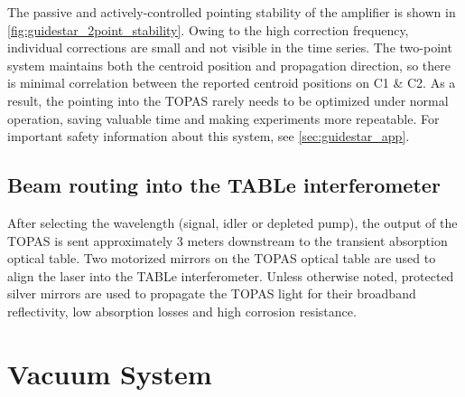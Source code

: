 The passive and actively-controlled pointing stability of the amplifier is shown in \cref{fig:guidestar_2point_stability}. Owing to the high correction frequency, individual corrections are small and not visible in the time series. The two-point system maintains both the centroid position and propagation direction, so there is minimal correlation between the reported centroid positions on C1 \& C2. As a result, the pointing into the TOPAS rarely needs to be optimized under normal operation, saving valuable time and making experiments more repeatable. For important safety information about this system, see \cref{sec:guidestar_app}.


\subsection{Beam routing into the TABLe interferometer}

After selecting the wavelength (signal, idler or depleted pump), the output of the TOPAS is sent approximately 3 meters downstream to the transient absorption optical table. Two motorized mirrors on the TOPAS optical table are used to align the laser into the TABLe interferometer. Unless otherwise noted, protected silver mirrors are used to propagate the TOPAS light for their broadband reflectivity, low absorption losses and high corrosion resistance. 

\section{Vacuum System}
\label{sec:Vacuum_System}
